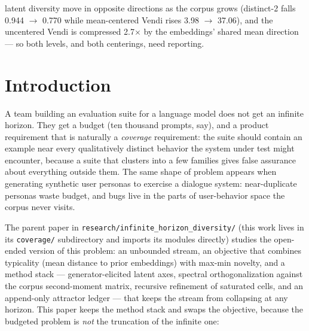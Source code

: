 \documentclass[11pt]{article}
\theoremstyle{plain}
\theoremstyle{definition}
\begin{document}
latent diversity move in opposite directions as the corpus grows (distinct-2 falls 0.944 $\to$ 0.770 while mean-centered Vendi rises 3.98 $\to$ 37.06), and the uncentered Vendi is compressed 2.7$\times$ by the embeddings' shared mean direction --- so both levels, and both centerings, need reporting.

\section{Introduction}
A team building an evaluation suite for a language model does not get an infinite horizon. They get a budget (ten thousand prompts, say), and a product requirement that is naturally a \emph{coverage} requirement: the suite should contain an example near every qualitatively distinct behavior the system under test might encounter, because a suite that clusters into a few families gives false assurance about everything outside them. The same shape of problem appears when generating synthetic user personas to exercise a dialogue system: near-duplicate personas waste budget, and bugs live in the parts of user-behavior space the corpus never visits.

The parent paper in \texttt{research/infinite\_horizon\_diversity/} (this work lives in its \texttt{coverage/} subdirectory and imports its modules directly) studies the open-ended version of this problem: an unbounded stream, an objective that combines typicality (mean distance to prior embeddings) with max-min novelty, and a method stack --- generator-elicited latent axes, spectral orthogonalization against the corpus second-moment matrix, recursive refinement of saturated cells, and an append-only attractor ledger --- that keeps the stream from collapsing at any horizon. This paper keeps the method stack and swaps the objective, because the budgeted problem is \emph{not} the truncation of the infinite one:
\end{document}
